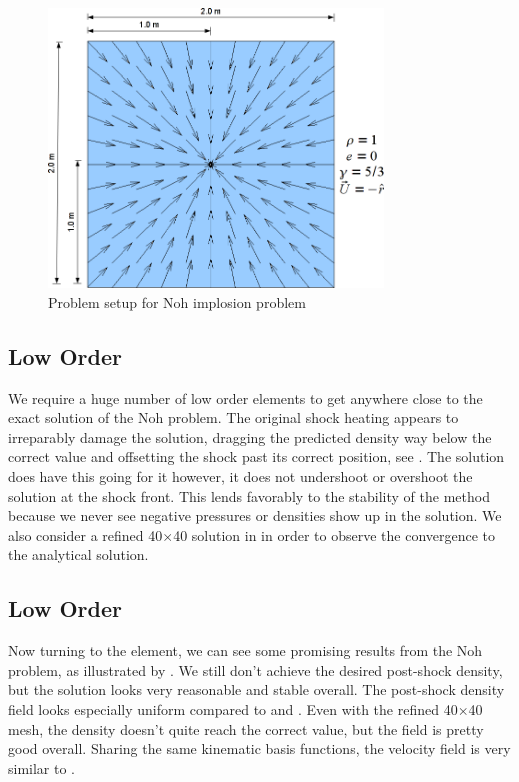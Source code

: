 \begin{figure}[h!]
 \centering
 \includegraphics[width=3.5in,keepaspectratio=true]{./Figures/NohImplosion.png}
 \caption{Problem setup for Noh implosion problem}
 \label{fig:NohImplosion}
\end{figure}

\subsection{Low Order \texorpdfstring{}{Q1-Q0}}
We require a huge number of low order elements to get anywhere close to the exact solution of the Noh problem. The original shock heating appears to irreparably damage the solution, dragging the predicted density way below the correct value and offsetting the shock past its correct position, see . The  solution does have this going for it however, it does not undershoot or overshoot the solution at the shock front. This lends favorably to the stability of the method because we never see negative pressures or densities show up in the solution. We also consider a refined 40$\times$40 solution in  in order to observe the convergence to the analytical solution.


\subsection{Low Order \texorpdfstring{}{Q1-Q1}}
Now turning to the  element, we can see some promising results from the Noh problem, as illustrated by . We still don't achieve the desired post-shock density, but the solution looks very reasonable and stable overall. The post-shock density field looks especially uniform compared to  and . Even with the refined 40$\times$40 mesh, the density doesn't quite reach the correct value, but the field is pretty good overall. Sharing the same kinematic basis functions, the velocity field is very similar to .

